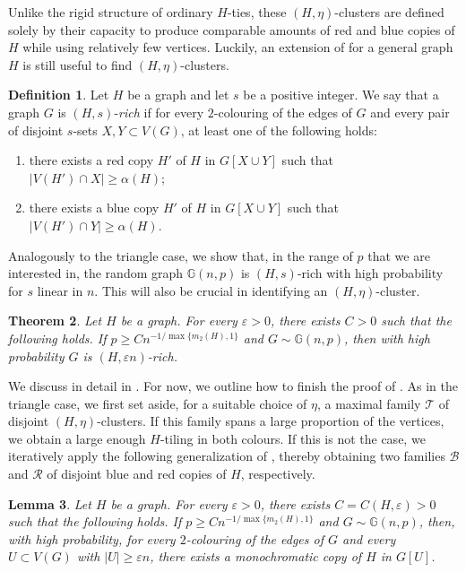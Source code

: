\documentclass[a4paper,reqno,11pt]{amsart}
\newtheorem{theorem}{Theorem}[section]
\newtheorem{lemma}[theorem]{Lemma}
\theoremstyle{definition}
\newtheorem{definition}[theorem]{Definition}
\theoremstyle{remark}
\newcommand\cB{\mathcal{B}}
\newcommand\cR{\mathcal{R}}
\renewcommand\geq{\geqslant}
\renewcommand\ge{\geqslant}
\begin{document}
Unlike the rigid structure of ordinary $H$-ties, these $(H,\eta)$-clusters are defined solely by their capacity to produce comparable amounts of red and blue copies of $H$ while using relatively few vertices. Luckily, an extension of  for a general graph $H$ is still useful to find $(H, \eta)$-clusters.

\begin{definition}\label{def:Hrich}
Let $H$ be a graph and let $s$ be a positive integer. We say that a graph $G$ is $(H,s)$-\textit{rich} if for every $2$-colouring of the edges of $G$ and every pair of disjoint $s$-sets $X, Y \subset V(G)$, at least one of the following holds:
\begin{enumerate}[label =\textnormal{(\roman*)}]
\item\label{item:3.4.i} there exists a red copy $H'$ of $H$ in $G[X\cup Y]$ such that $|V(H') \cap X| \ge \alpha(H)$;
\item\label{item:3.4.ii} there exists a blue copy $H'$ of $H$ in $G[X\cup Y]$ such that $|V(H') \cap Y| \ge \alpha(H)$.
\end{enumerate}
\end{definition}

Analogously to the triangle case, we show that, in the range of $p$ that we are interested in, the random graph $\mathbb{G}(n,p)$ is $(H,s)$-rich with high probability for $s$ linear in $n$. This will also be crucial in identifying an $(H,\eta)$-cluster.

\begin{theorem}\label{thm:Htrans}
Let $H$ be a graph. For every $\varepsilon > 0$, there exists $C>0$ such that the following holds. If $p\geq Cn^{-1/\max\{m_2(H),1\}}$ and $G\sim \mathbb{G}(n,p)$, then with high probability $G$ is $(H,\varepsilon n)$-rich.
\end{theorem}

We discuss  in detail in . For now, we outline how to finish the proof of . As in the triangle case, we first set aside, for a suitable choice of $\eta$, a maximal family $\mathcal{T}$ of disjoint $(H,\eta)$-clusters. If this family spans a large proportion of the vertices, we obtain a large enough $H$-tiling in both colours. If this is not the case, we iteratively apply the following generalization of , thereby obtaining two families $\cB$ and $\cR$ of disjoint blue and red copies of $H$, respectively.

\begin{lemma}\label{lem:Hsup}
Let $H$ be a graph. For every $\varepsilon >0$, there exists $C=C(H,\varepsilon)>0$ such that the following holds. If $p\geq Cn^{-1/\max\{m_2(H),1\}}$ and $G\sim \mathbb{G}(n,p)$, then, with high probability, for every $2$-colouring of the edges of $G$ and every $U\subset V(G)$ with $|U|\geq \varepsilon n$, there exists a monochromatic copy of $H$ in $G[U]$. 
\end{lemma}
\end{document}
